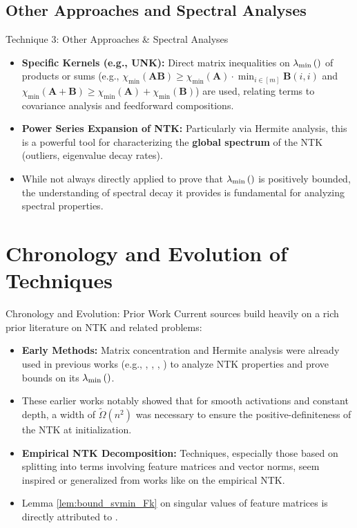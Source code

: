 \documentclass{beamer}
\newcommand{\evmin}[1]{\lambda_{\rm min}\left(#1\right)} %
\begin{document}
\subsection{Other Approaches and Spectral Analyses}
\begin{frame}{Technique 3: Other Approaches & Spectral Analyses}
  \begin{itemize}[<+->]
    \item \textbf{Specific Kernels (e.g., UNK):} Direct matrix inequalities on $\evmin{}$ of products or sums (e.g., $\chi_{\min}(\mathbf{AB}) \geq \chi_{\min}(\mathbf{A}) \cdot \min_{i\in[m]} \mathbf{B}(i,i)$ and $\chi_{\min}(\mathbf{A}+\mathbf{B}) \geq \chi_{\min}(\mathbf{A}) + \chi_{\min}(\mathbf{B})$) are used, relating terms to covariance analysis and feedforward compositions.
    \item \textbf{Power Series Expansion of NTK:} Particularly via Hermite analysis, this is a powerful tool for characterizing the \textbf{global spectrum} of the NTK (outliers, eigenvalue decay rates).
    \item While not always directly applied to prove that $\evmin{}$ is positively bounded, the understanding of spectral decay it provides is fundamental for analyzing spectral properties.
  \end{itemize}
\end{frame}

\section{Chronology and Evolution of Techniques}
\begin{frame}{Chronology and Evolution: Prior Work}
  Current sources build heavily on a rich prior literature on NTK and related problems:
  \begin{itemize}[<+->]
    \item \textbf{Early Methods:} Matrix concentration and Hermite analysis were already used in previous works (e.g., \cite{SD-JL-HL-LW-XZ:19}, \cite{oymak2020hermite}, \cite{ng2020hermite1}, \cite{ng2021hermite2}) to analyze NTK properties and prove bounds on its $\evmin{}$.
    \item These earlier works notably showed that for smooth activations and constant depth, a width of $\tilde{\Omega}(n^2)$ was necessary to ensure the positive-definiteness of the NTK at initialization.
    \item \textbf{Empirical NTK Decomposition:} Techniques, especially those based on splitting into terms involving feature matrices and vector norms, seem inspired or generalized from works like \cite{nguyen2021tight} on the empirical NTK.
    \item Lemma \ref{lem:bound_svmin_Fk} on singular values of feature matrices is directly attributed to \cite{QuynhNTK2021}.
  \end{itemize}
\end{frame}
\end{document}
